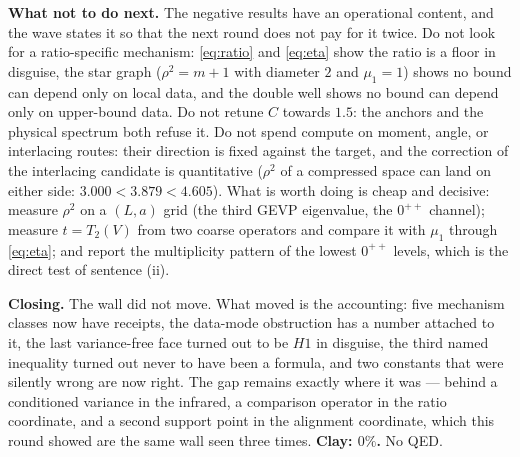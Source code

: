 \textbf{What not to do next.} The negative results have an operational content, and the wave states
it so that the next round does not pay for it twice. Do not look for a ratio-specific mechanism:
\eqref{eq:ratio} and \eqref{eq:eta} show the ratio is a floor in disguise, the star graph
($\rho^2=m+1$ with diameter $2$ and $\mu_1=1$) shows no bound can depend only on local data, and the
double well shows no bound can depend only on upper-bound data. Do not retune $C$ towards $1.5$: the
anchors and the physical spectrum both refuse it. Do not spend compute on moment, angle, or
interlacing routes: their direction is fixed against the target, and the correction of the
interlacing candidate is quantitative ($\rho^2$ of a compressed space can land on either side:
$3.000<3.879<4.605$). What is worth doing is cheap and decisive: measure $\rho^2$ on a $(L,a)$ grid
(the third GEVP eigenvalue, the $0^{++}$ channel); measure $t=T_2(V)$ from two coarse operators and
compare it with $\mu_1$ through \eqref{eq:eta}; and report the multiplicity pattern of the lowest
$0^{++}$ levels, which is the direct test of sentence (ii).

\textbf{Closing.} The wall did not move. What moved is the accounting: five mechanism classes now
have receipts, the data-mode obstruction has a number attached to it, the last variance-free face
turned out to be $H1$ in disguise, the third named inequality turned out never to have been a
formula, and two constants that were silently wrong are now right. The gap remains exactly where it
was --- behind a conditioned variance in the infrared, a comparison operator in the ratio
coordinate, and a second support point in the alignment coordinate, which this round showed are the
same wall seen three times. \textbf{Clay: $0\%$.} No QED.
